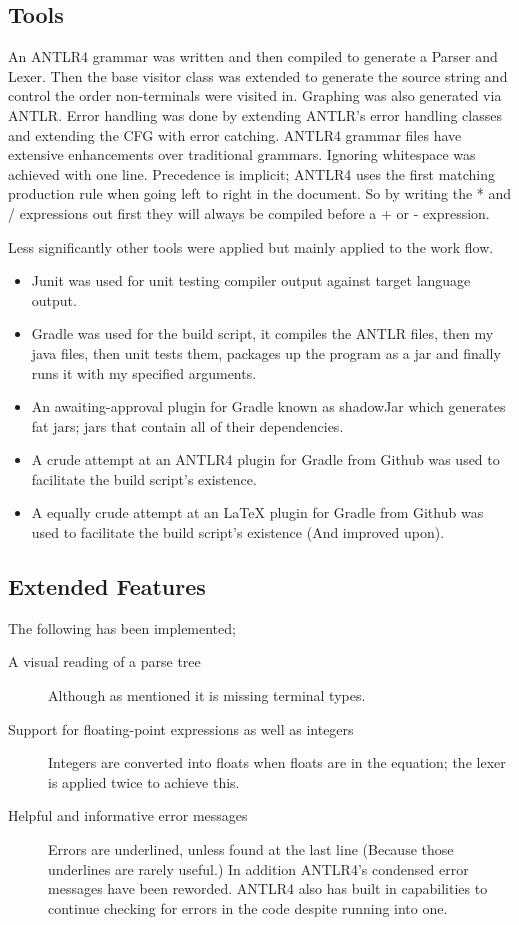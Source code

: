 \documentclass[a4paper,12pt]{article}
\begin{document}
\subsection{Tools}
An ANTLR4 grammar was written and then compiled to generate a Parser and Lexer. Then the base visitor class was extended to generate the source string and control the order non-terminals were visited in. Graphing was also generated via ANTLR. Error handling was done by extending ANTLR's error handling classes and extending the \gls{CFG} with error catching. ANTLR4 grammar files have extensive enhancements over traditional grammars. Ignoring whitespace was achieved with one
line. Precedence is implicit; ANTLR4 uses the first matching production rule when going left to right in the document. So by writing the * and / expressions out first they will always be compiled before a + or - expression.

Less significantly other tools were applied but mainly applied to the work flow. 
\begin{itemize}
    \item Junit was used for unit testing compiler output against target language output.
    \item Gradle was used for the build script, it compiles the ANTLR files, then my java files, then unit tests them, packages up the program as a jar and finally runs it with my specified arguments. 
    \item An awaiting-approval plugin for Gradle known as shadowJar which generates fat jars; jars that contain all of their dependencies.
    \item A crude attempt at an ANTLR4 plugin for Gradle from Github was used to facilitate the build script's existence.
    \item A equally crude attempt at an LaTeX plugin for Gradle from Github was used to facilitate the build script's existence (And improved upon).
\end{itemize}

\subsection{Extended Features}
The following has been implemented;
\begin{description}
    \item[A visual reading of a parse tree] \hfill
        Although as mentioned it is missing terminal types.
    \item[Support for floating-point expressions as well as integers] \hfill
        Integers are converted into floats when floats are in the equation; the lexer is applied twice to achieve this.
    \item[Helpful and informative error messages]
        Errors are underlined, unless found at the last line (Because those underlines are rarely useful.) In addition ANTLR4's condensed error messages have been reworded. ANTLR4 also has built in capabilities to continue checking for errors in the code despite running into one.
\end{description}
\end{document}
